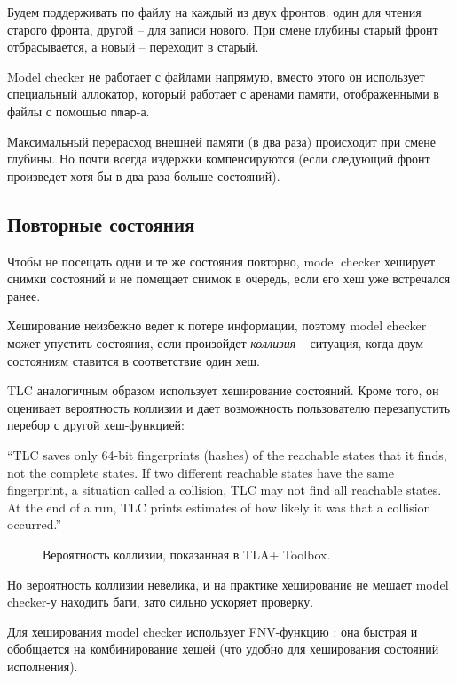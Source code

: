 Будем поддерживать по файлу на каждый из двух фронтов: один для чтения старого фронта, другой – для записи нового. При смене глубины старый фронт отбрасывается, а новый – переходит в старый. 

Model checker не работает с файлами напрямую, вместо этого он использует специальный аллокатор, который работает с аренами памяти, отображенными в файлы с помощью \texttt{mmap}-а.

Максимальный перерасход внешней памяти (в два раза) происходит при смене глубины. Но почти всегда издержки компенсируются (если следующий фронт произведет хотя бы в два раза больше состояний).


\subsection{Повторные состояния}

Чтобы не посещать одни и те же состояния повторно, model checker хеширует снимки состояний и не помещает снимок в очередь, если его хеш уже встречался ранее.

Хеширование неизбежно ведет к потере информации, поэтому model checker может упустить состояния, если произойдет \emph{коллизия} – ситуация, когда двум состояниям ставится в соответствие один хеш. 

TLC аналогичным образом использует хеширование состояний. Кроме того, он оценивает вероятность коллизии и дает возможность пользователю перезапустить перебор с другой хеш-функцией:

“TLC saves only 64-bit fingerprints (hashes) of the reachable states that it finds, not the complete states.  If two different reachable states have the same fingerprint, a situation called a collision, TLC may not find all reachable states.  At the end of a run, TLC prints estimates of how likely it was that a collision occurred.” \autocite{TlcOptions}

\begin{figure}
	\bigskip
	\caption{Вероятность коллизии, показанная в TLA+ Toolbox.}\label{fig:fingerprint}
\end{figure}

Но вероятность коллизии невелика, и на практике хеширование не мешает model checker-у находить баги, зато сильно ускоряет проверку. 

Для хеширования model checker использует FNV-функцию \autocite{Fnv}: она быстрая и обобщается на комбинирование хешей (что удобно для хеширования состояний исполнения).
  

